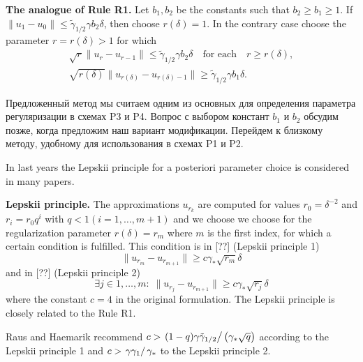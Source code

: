 \documentclass[10pt]{article}
\theoremstyle{definition}
\theoremstyle{remark}
\theoremstyle{plain}
\begin{document}
\textbf{The analogue of Rule R1.}
Let $b_1,b_2$ be the constants such that $b_2\geqslant b_1 \geqslant 1$. If $\|u_1 - u_0\| \leqslant \tilde{\gamma}_{1/2} \gamma b_2\delta$, then choose $r(\delta) = 1$. In the contrary case choose the parameter $r = r(\delta) >1$ for which 
\begin{gather*}
\sqrt{r} \|u_r - u_{r-1}\| \leqslant 
 \tilde{\gamma}_{1/2} \gamma b_2\delta \quad \text{for each}\quad  r\geqslant r(\delta), \\
\sqrt{r(\delta)}\|u_{r(\delta)} - u_{r(\delta)-1}\| \geqslant \tilde{\gamma}_{1/2} \gamma b_1\delta.
\end{gather*}

Предложенный метод мы считаем одним из основных для определения параметра регуляризации в схемах P3 и P4. Вопрос с выбором констант $b_1$ и $b_2$
обсудим позже, когда предложим наш вариант модификации. Перейдем к близкому методу, удобному для использования в схемах P1 и P2.

In last years the Lepskii principle for a posteriori parameter choice is considered in many papers.

\textbf{Lepskii principle.}
The approximations $u_{r_k}$ are computed for values $r_0 = \delta^{-2}$ and $r_i = r_0q^i$ with $q<1(i=1,\ldots,m+1)$ and we choose we choose for the regularization parameter $r(\delta) = r_m $ where $m$ is the first index, for which a certain condition is fulfilled. This condition is in [??] (Lepskii principle 1)
$$
\|u_{r_m} - u_{r_{m+1}} \| \geqslant c\gamma_*\sqrt{r_m} \delta
$$
and in [??] (Lepskii principle 2)
$$
\exists j\in1,\ldots, m:\; \|u_{r_j} - u_{r_{m+1}} \| \geqslant c\gamma_*\sqrt{r_j} \delta
$$
where the constant $c = 4$ in the original formulation.
The Lepskii principle is closely related to the Rule R1. 

Raus and Haemarik recommend 
$c>\left.(1-q)\gamma\tilde{\gamma}_{1/2}\right/\left(\gamma_* \sqrt{q}\right)$
according to the Lepskii principle 1 and 
$c>\left.\gamma\gamma_1\right/\gamma_*$
to the Lepskii principle 2.
\end{document}
